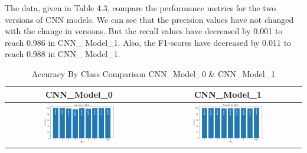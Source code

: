 \noindent The data, given in Table 4.3, compare the performance metrics for the two versions of CNN models. We can see that the precision values have not changed with the change in versions. But the recall values have decreased by 0.001 to reach 0.986 in CNN\_ Model\_1. Also, the F1-scores have decreased by 0.011 to reach 0.988 in CNN\_ Model\_1.

\begin{table}[h!]
    \centering
    \caption{Accuracy By Class Comparison CNN\_Model\_0 \& CNN\_Model\_1}
    \begin{tabular}{|c|c|}
      \hline
      \textbf{CNN\_Model\_0} & \textbf{CNN\_Model\_1} \\
      \hline
      \includegraphics[width=0.5\textwidth]{Images/Perf_Eval/M0_acc_by_cls.png} & \includegraphics[width=0.5\textwidth]{Images/Perf_Eval/M1_acc_by_cls.png} \\
      \hline
    \end{tabular}
\end{table}

